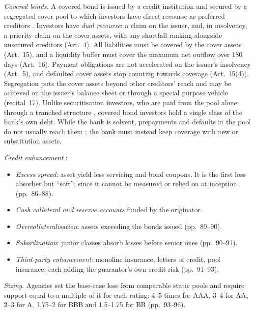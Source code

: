 \begin{qfmethod}\label{meth:abs-structures-credit-enhancement}
 \emph{Covered bonds.} A covered bond is issued by a credit institution and secured by a segregated cover pool to which investors have direct recourse as preferred creditors \citep[Art.~3(1), (3)]{eu-dir-2019-2162-covered-bonds}. Investors have \emph{dual recourse}: a claim on the issuer, and, in insolvency, a priority claim on the cover assets, with any shortfall ranking alongside unsecured creditors (Art.~4). All liabilities must be covered by the cover assets (Art.~15), and a liquidity buffer must cover the maximum net outflow over 180 days (Art.~16). Payment obligations are not accelerated on the issuer's insolvency (Art.~5), and defaulted cover assets stop counting towards coverage (Art.~15(4)). Segregation puts the cover assets beyond other creditors' reach and may be achieved on the issuer's balance sheet or through a special purpose vehicle (recital~17). Unlike securitisation investors, who are paid from the pool alone through a tranched structure \citep[Art.~2(1)]{eu-2017-2402-securitisation}, covered bond investors hold a single class of the bank's own debt. While the bank is solvent, prepayments and defaults in the pool do not usually reach them \citep[p.~7]{wide-fuster-mbs-review}; the bank must instead keep coverage with new or substitution assets.

\emph{Credit enhancement} \citep[pp.~85--97]{fabozzi-kothari-securitisation-2008}:
\begin{itemize}
\item \emph{Excess spread}: asset yield less servicing and bond coupons. It is the first loss absorber but ``soft'', since it cannot be measured or relied on at inception (pp.~86--88).
\item \emph{Cash collateral and reserve accounts} funded by the originator.
\item \emph{Overcollateralisation}: assets exceeding the bonds issued (pp.~89--90).
\item \emph{Subordination}: junior classes absorb losses before senior ones (pp.~90--91).
\item \emph{Third-party enhancement}: monoline insurance, letters of credit, pool insurance, each adding the guarantor's own credit risk (pp.~91--93).
\end{itemize}
\emph{Sizing.} Agencies set the base-case loss from comparable static pools and require support equal to a multiple of it for each rating: 4--5 times for AAA, 3--4 for AA, 2--3 for A, 1.75--2 for BBB and 1.5--1.75 for BB (pp.~93--96).


\end{qfmethod}
